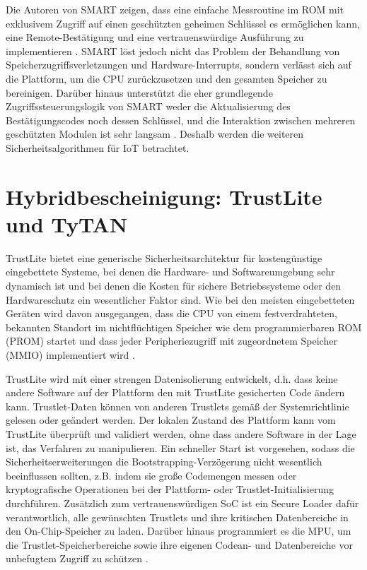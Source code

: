 Die Autoren von SMART zeigen, dass eine einfache Messroutine im ROM mit exklusivem Zugriff auf einen geschützten geheimen Schlüssel es ermöglichen kann, eine Remote-Bestätigung und eine vertrauenswürdige Ausführung zu implementieren \cite{website:smart}. SMART löst jedoch nicht das Problem der Behandlung von Speicherzugriffsverletzungen und Hardware-Interrupts, sondern verlässt sich auf die Plattform, um die CPU zurückzusetzen und den gesamten Speicher zu bereinigen. Darüber hinaus unterstützt die eher grundlegende Zugriffssteuerungslogik von SMART weder die Aktualisierung des Bestätigungscodes noch dessen Schlüssel, und die Interaktion zwischen mehreren geschützten Modulen ist sehr langsam \cite[p.2]{website:TrustLite}. Deshalb werden die weiteren Sicherheitsalgorithmen für IoT betrachtet.

\section{Hybridbescheinigung: TrustLite und TyTAN}
\label{sec:sicher:trust}
TrustLite bietet eine generische Sicherheitsarchitektur für kostengünstige eingebettete Systeme, bei denen die Hardware- und Softwareumgebung sehr dynamisch ist und bei denen die Kosten für sichere Betriebssysteme oder den Hardwareschutz ein wesentlicher Faktor sind. Wie bei den meisten eingebetteten Geräten wird davon ausgegangen, dass die CPU von einem festverdrahteten, bekannten Standort im nichtflüchtigen Speicher wie dem programmierbaren ROM (PROM) startet und dass jeder Peripheriezugriff mit zugeordnetem Speicher (MMIO) implementiert wird \cite[p.3]{website:TrustLite}. 

TrustLite wird mit einer strengen Datenisolierung entwickelt, d.h. dass keine andere Software auf der Plattform den mit TrustLite gesicherten Code ändern kann. Trustlet-Daten können von anderen Trustlets gemäß der Systemrichtlinie gelesen oder geändert werden. Der lokalen Zustand des Plattform kann vom TrustLite überprüft und validiert werden, ohne dass andere Software in der Lage ist, das Verfahren zu manipulieren. Ein schneller Start ist vorgesehen, sodass die Sicherheitserweiterungen die Bootstrapping-Verzögerung nicht wesentlich beeinflussen sollten, z.B. indem sie große Codemengen messen oder kryptografische Operationen bei der Plattform- oder Trustlet-Initialisierung durchführen. Zusätzlich zum vertrauenswürdigen SoC ist ein Secure Loader dafür verantwortlich, alle gewünschten Trustlets und ihre kritischen Datenbereiche in den On-Chip-Speicher zu laden. Darüber hinaus programmiert es die MPU, um die Trustlet-Speicherbereiche sowie ihre eigenen Codean- und Datenbereiche vor unbefugtem Zugriff zu schützen \cite[p.4]{website:TrustLite}. 

